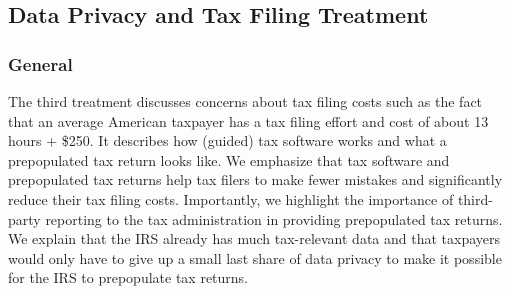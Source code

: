 \documentclass[11pt]{article}
\begin{document}
%

\subsection{Data Privacy and Tax Filing Treatment}
\subsubsection*{General}
The third treatment discusses concerns about tax filing costs such as the fact that an average American taxpayer has a tax filing effort and cost of about 13 hours + \$250. It describes how (guided) tax software works and what a prepopulated tax return looks like. We emphasize that tax software and prepopulated tax returns help tax filers to make fewer mistakes and significantly reduce their tax filing costs. Importantly, we highlight the importance of third-party reporting to the tax administration in providing prepopulated tax returns. We explain that the IRS already has much tax-relevant data and that taxpayers would only have to give up a small last share of data privacy to make it possible for the IRS to prepopulate tax returns. 
\end{document}
